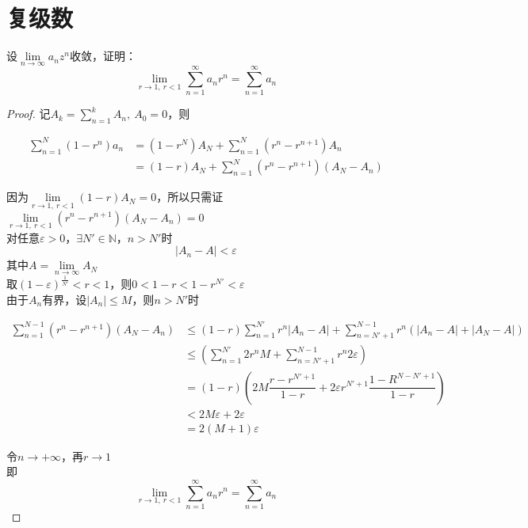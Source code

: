 \section{复级数}

\begin{proposition}

    设$\lim\limits_{n\to\infty}{a_nz^n}$收敛，证明：
    $$\lim\limits_{r \to 1,\ r < 1}{\sum\limits_{n=1}^{\infty}{a_nr^n}} = \sum\limits_{n=1}^{\infty}{a_n}$$

\end{proposition}

\begin{proof}
    
    记$A_k = \sum\limits_{n = 1}^{k}{A_n},\ A_0 = 0$，则

    \begin{align*}
        \sum\limits_{n=1}^{N}{(1-r^n)a_n} & = (1-r^N)A_N + \sum\limits_{n=1}^{N}{(r^n-r^{n+1})A_n}\\
        & = (1 - r)A_N + \sum\limits_{n=1}^{N}{(r^n-r^{n+1})(A_N - A_n)}
    \end{align*}

    因为$\lim\limits_{r \to 1,\ r < 1}{(1 - r)A_N} = 0$，所以只需证$\lim\limits_{r \to 1,\ r < 1}{(r^n-r^{n+1})(A_N - A_n)} = 0$\\
    对任意$\varepsilon > 0 $，$\exists N' \in \mathbb{N}$，$n > N'$时
    $$|A_n - A| < \varepsilon $$
    其中$A = \lim\limits_{n\to\infty}{A_N}$\\
    取$(1-\varepsilon)^{\frac{1}{N'}} < r < 1$，则$0 < 1 - r < 1 - r^{N'} < \varepsilon $\\
    由于$A_n$有界，设$|A_n| \leq M $，则$n > N'$时
    
    \begin{align*}
        \sum\limits_{n=1}^{N-1}{(r^n - r^{n+1})(A_N - A_n)} & \leq (1 - r)\sum\limits_{n=1}^{N'}{r^n|A_n - A|} + \sum\limits_{n=N'+1}^{N-1}{r^n(|A_n - A| + |A_N -A|)}\\
        & \leq (\sum\limits_{n=1}^{N'}{2r^nM} + \sum\limits_{n=N'+1}^{N-1}{r^n2\varepsilon})\\
        & = (1 - r)\left(2M\dfrac{r - r^{N'+1}}{1 - r} + 2\varepsilon r^{N'+1}\dfrac{1 - R^{N-N'+1}}{1 - r}\right)\\
        & < 2M\varepsilon + 2\varepsilon\\
        & = 2(M+1)\varepsilon
    \end{align*}

    令$n\to+\infty$，再$r\to1$\\
    即
    $$\lim\limits_{r \to 1,\ r < 1}{\sum\limits_{n=1}^{\infty}{a_nr^n}} = \sum\limits_{n=1}^{\infty}{a_n}$$

\end{proof}

